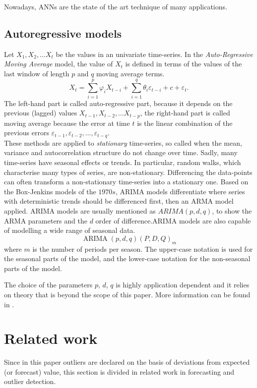 \documentclass{sig-alternate-sigmod07}
\begin{document}
Nowadays, ANNs are the state of the art technique of many applications.


\subsection{Autoregressive models}
Let $X_1, X_2, \ldots X_t$ be the values in an univariate time-series. In the \emph{Auto-Regressive Moving Average} model, the value of $X_t$ is defined in terms of the values of the last window of length $p$ and $q$ moving average terms.
\begin{displaymath}X_t =  \sum_{i=1}^p \varphi_i X_{t-i} + \sum_{i=1}^q \theta_i \varepsilon_{t-i} + c + \varepsilon_t.\end{displaymath}
The left-hand part is called auto-regressive part, because it depends on the previous (lagged) values $X_{t-1}, X_{t-2}, \ldots X_{t-p}$, the right-hand part is called moving average because the error at time $t$ is the linear combination of the previous errors $\varepsilon_{t-1}, \varepsilon_{t-2}, \ldots, \varepsilon_{t-q}$. \\
These methods are applied to \emph{stationary} time-series, so called when the mean, variance and autocorrelation structure do not change over time. Sadly, many time-series have seasonal effects or trends. In particular, random walks,
which characterise many types of series, are non-stationary. Differencing the data-points can often transform a non-stationary time-series into a stationary one. Based on the Box-Jenkins models of the $1970s$, ARIMA models differentiate where series with deterministic trends should be differenced first, then an ARMA model applied. ARIMA models are usually mentioned as $ARIMA (p, d, q)$, to show the ARMA parameters and the $d$ order of difference.ARIMA models are also capable of modelling a wide range of seasonal data. 
\begin{displaymath}
\operatorname{ARIMA}(p,d,q) (P,D,Q)_m
\end{displaymath}
where $m$ is the number of periods per season. The upper-case notation is used for the seasonal parts of the model, and the lower-case notation for the non-seasonal parts of the model.

The choice of the parameters $p$, $d$, $q$ is highly application dependent and it relies on theory that is beyond the scope of this paper. More information can be found in \cite{rousseeuw2005robust}.


\section{Related work}
 Since in this paper outliers are declared on the basis of deviations from expected (or forecast) value, this section is divided in related work in forecasting and outlier detection.
\end{document}
